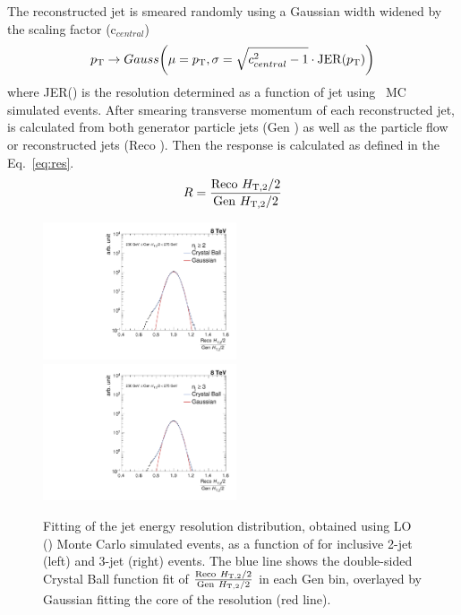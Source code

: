 The reconstructed jet \pt is smeared randomly using a Gaussian width widened by the scaling factor (c$_{central}$) 
\begin{equation}
p_{\mathrm{T}} \rightarrow Gauss\bigg(\mu = p_{\mathrm{T}}, \sigma = \sqrt{c^2_{central} - 1} \cdot {\rm JER}(p_{\mathrm{T}})\bigg)
\end{equation}
where JER(\pt) is the resolution determined as a function of jet \pt using \MGP~MC simulated events. After smearing transverse momentum of each reconstructed jet, \httwo is calculated from both generator particle jets (Gen \httwons) as well as the particle flow or reconstructed jets (Reco \httwons). Then the response is calculated as defined in the Eq.~\ref{eq:res}. 
\begin{equation}
\label{eq:res}
  R = \frac{{\rm Reco}~\httwo}{{\rm Gen}~\httwo}
\end{equation}

\begin{figure}[ht]
 \begin{center}
 \hspace*{-5mm}\includegraphics[width=0.51\textwidth]{Plots_HT_2_150/Fit_Res_2_final_crystal_genbin_250-275_crystal_nomet.pdf}%
 ~~\includegraphics[width=0.51\textwidth]{Plots_HT_2_150/Fit_Res_3_final_crystal_genbin_250-275_crystal_nomet.pdf}
 \caption[Fitting of the jet energy resolution distribution as a function of \httwo.]{Fitting of the jet energy resolution distribution, obtained using LO \MadGraphFn\plusn \PYTHIAS (\MGP) Monte Carlo simulated events, as a function of \httwo for inclusive 2-jet (left) and 3-jet (right) events. The blue line shows the double-sided Crystal Ball function fit of $\frac{{\rm Reco}~\httwo}{{\rm Gen}~\httwo}$ in each Gen \httwo bin, overlayed by Gaussian fitting the core of the resolution (red line).}
 \label{fig:fit_gauss}
 \end{center}
\end{figure}

